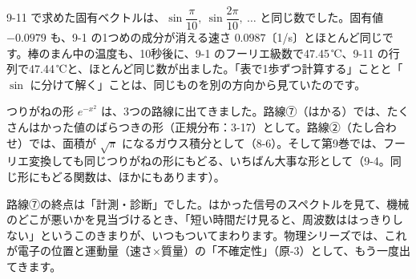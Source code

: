 \begin{bkfigure}
\end{bkfigure}

9-11 で求めた固有ベクトルは、$\sin\dfrac{\pi}{10},\ \sin\dfrac{2\pi}{10},\ \ldots$ と同じ数でした。固有値 $-0.0979$ も、9-1 の1つめの成分が消える速さ $0.0987$〔1/s〕とほとんど同じです。棒のまん中の温度も、10秒後に、9-1 のフーリエ級数で47.45\,℃、9-11 の行列で47.44\,℃と、ほとんど同じ数が出ました。「表で1歩ずつ計算する」ことと「$\sin$ に分けて解く」ことは、同じものを別の方向から見ていたのです。


\label{bk:9-13:gauss}つりがねの形 $e^{-x^2}$ は、3つの路線に出てきました。路線⑦（はかる）では、たくさんはかった値のばらつきの形（正規分布：3-17）として。路線②（たし合わせ）では、面積が $\sqrt\pi$ になるガウス積分として（8-6）。そして第9巻では、フーリエ変換しても同じつりがねの形にもどる、いちばん大事な形として（9-4。同じ形にもどる関数は、ほかにもあります）。

\begin{bkfigure}
\end{bkfigure}

路線⑦の終点は「計測・診断」でした。はかった信号のスペクトルを見て、機械のどこが悪いかを見当づけるとき、「短い時間だけ見ると、周波数ははっきりしない」というこのきまりが、いつもついてまわります。物理シリーズでは、これが電子の位置と運動量（速さ×質量）の「不確定性」（原-3）として、もう一度出てきます。


